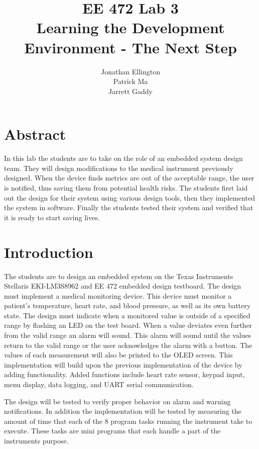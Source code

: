\documentclass[12pt]{article} %
\title{\TitleFont EE 472 Lab 3 \\ Learning the Development Environment - The Next Step \vfill }
\author{\AuthorFont Jonathan Ellington \\ Patrick Ma \\ Jarrett Gaddy}
\date{}
\begin{document}
\maketitle
\thispagestyle{empty}
\pagebreak
\tableofcontents
\listoftables
\listoffigures
\thispagestyle{empty}
\pagebreak
\setcounter{page}{1}


\section{Abstract} In this lab the students are to take on the role of an
embedded system design team. They will design modifications to the medical
instrument previously designed. When the device finds metrics are out of the
acceptable range, the user is notified, thus saving them from potential health
risks. The students first laid out the design for their system using various
design tools, then they implemented the system in software. Finally the
students tested their system and verified that it is ready to start saving
lives. 

\section{Introduction} The students are to design an embedded system on the
Texas Instruments Stellaris EKI-LM3S8962 and EE 472 embedded design testboard.
The design must implement a medical monitoring device. This device must monitor
a patient's temperature, heart rate, and blood pressure, as well as its own
battery state.  The design must indicate when a monitored value is outside of a
specified range by flashing an LED on the test board. When a value deviates
even further from the valid range an alarm will sound. This alarm will sound
until the values return to the valid range or the user acknowledges the alarm
with a button. The values of each measurement will also be printed to the OLED
screen. This implementation will build upon the previous implementation of the
device by adding functionality. Added functions include heart rate sensor,
keypad input, menu display, data logging, and UART serial communication.

The design will be tested to verify proper behavior on alarm and warning
notifications. In addition the implementation will be tested by measuring the
amount of time that each of the 8 program tasks running the instrument take to
execute. These tasks are mini programs that each handle a part of the
instruments purpose.
\end{document}
